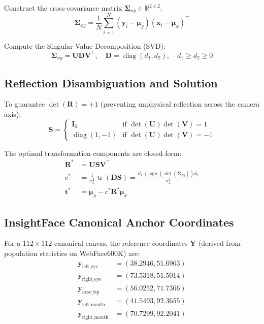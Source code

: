 \documentclass[11pt,a4paper]{article}
\begin{document}
Construct the cross-covariance matrix $\bm{\Sigma}_{xy} \in \mathbb{R}^{2 \times 2}$:
\begin{equation}
\bm{\Sigma}_{xy} = \frac{1}{N} \sum_{i=1}^N (\mathbf{y}_i - \bm{\mu}_y)(\mathbf{x}_i - \bm{\mu}_x)^\top
\end{equation}

Compute the Singular Value Decomposition (SVD):
\begin{equation}
\bm{\Sigma}_{xy} = \mathbf{U} \mathbf{D} \mathbf{V}^\top, \quad \mathbf{D} = \operatorname{diag}(d_1, d_2), \quad d_1 \ge d_2 \ge 0
\end{equation}

\subsection{Reflection Disambiguation and Solution}
To guarantee $\det(\mathbf{R}) = +1$ (preventing unphysical reflection across the camera axis):
\begin{equation}
\mathbf{S} = \begin{cases} 
\mathbf{I}_2 & \text{if } \det(\mathbf{U}) \det(\mathbf{V}) = 1 \\
\operatorname{diag}(1, -1) & \text{if } \det(\mathbf{U}) \det(\mathbf{V}) = -1 
\end{cases}
\end{equation}

The optimal transformation components are closed-form:
\begin{align}
\mathbf{R}^* &= \mathbf{U} \mathbf{S} \mathbf{V}^\top \\
c^* &= \frac{1}{\sigma_x^2} \operatorname{tr}(\mathbf{D} \mathbf{S}) = \frac{d_1 + \operatorname{sgn}(\det(\bm{\Sigma}_{xy})) d_2}{\sigma_x^2} \\
\mathbf{t}^* &= \bm{\mu}_y - c^* \mathbf{R}^* \bm{\mu}_x
\end{align}

\subsection{InsightFace Canonical Anchor Coordinates}
For a $112 \times 112$ canonical canvas, the reference coordinates $\mathbf{Y}$ (derived from population statistics on WebFace600K) are:
\begin{align*}
\mathbf{y}_{\text{left\_eye}} &= (38.2946, 51.6963) \\
\mathbf{y}_{\text{right\_eye}} &= (73.5318, 51.5014) \\
\mathbf{y}_{\text{nose\_tip}} &= (56.0252, 71.7366) \\
\mathbf{y}_{\text{left\_mouth}} &= (41.5493, 92.3655) \\
\mathbf{y}_{\text{right\_mouth}} &= (70.7299, 92.2041)
\end{align*}
\end{document}
